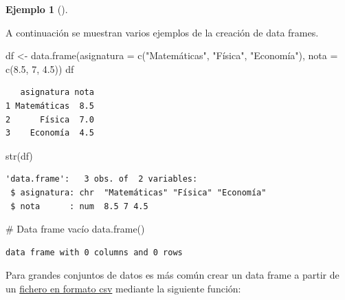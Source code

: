 \documentclass[
  a4paper,
]{scrreport}
\newenvironment{Shaded}{\begin{snugshade}}{\end{snugshade}}
\newcommand{\AttributeTok}[1]{\textcolor[rgb]{0.40,0.45,0.13}{#1}}
\newcommand{\CommentTok}[1]{\textcolor[rgb]{0.37,0.37,0.37}{#1}}
\newcommand{\DecValTok}[1]{\textcolor[rgb]{0.68,0.00,0.00}{#1}}
\newcommand{\FloatTok}[1]{\textcolor[rgb]{0.68,0.00,0.00}{#1}}
\newcommand{\FunctionTok}[1]{\textcolor[rgb]{0.28,0.35,0.67}{#1}}
\newcommand{\NormalTok}[1]{\textcolor[rgb]{0.00,0.23,0.31}{#1}}
\newcommand{\OtherTok}[1]{\textcolor[rgb]{0.00,0.23,0.31}{#1}}
\newcommand{\StringTok}[1]{\textcolor[rgb]{0.13,0.47,0.30}{#1}}
\theoremstyle{definition}
\theoremstyle{definition}
\newtheorem{example}{Ejemplo}[chapter]
\theoremstyle{remark}
\begin{document}
\leavevmode{}%
\begin{example}[]\label{exm-creacion-data-frames}

A continuación se muestran varios ejemplos de la creación de data
frames.

\begin{Shaded}
\begin{Highlighting}[]
\NormalTok{df }\OtherTok{\textless{}{-}} \FunctionTok{data.frame}\NormalTok{(}\AttributeTok{asignatura =} \FunctionTok{c}\NormalTok{(}\StringTok{"Matemáticas"}\NormalTok{, }\StringTok{"Física"}\NormalTok{, }\StringTok{"Economía"}\NormalTok{), }\AttributeTok{nota =} \FunctionTok{c}\NormalTok{(}\FloatTok{8.5}\NormalTok{, }\DecValTok{7}\NormalTok{, }\FloatTok{4.5}\NormalTok{))}
\NormalTok{df}
\end{Highlighting}
\end{Shaded}

\begin{verbatim}
   asignatura nota
1 Matemáticas  8.5
2      Física  7.0
3    Economía  4.5
\end{verbatim}

\begin{Shaded}
\begin{Highlighting}[]
\FunctionTok{str}\NormalTok{(df)}
\end{Highlighting}
\end{Shaded}

\begin{verbatim}
'data.frame':   3 obs. of  2 variables:
 $ asignatura: chr  "Matemáticas" "Física" "Economía"
 $ nota      : num  8.5 7 4.5
\end{verbatim}

\begin{Shaded}
\begin{Highlighting}[]
\CommentTok{\# Data frame vacío}
\FunctionTok{data.frame}\NormalTok{()}
\end{Highlighting}
\end{Shaded}

\begin{verbatim}
data frame with 0 columns and 0 rows
\end{verbatim}

\end{example}

Para grandes conjuntos de datos es más común crear un data frame a
partir de un
\href{https://es.wikipedia.org/wiki/Valores_separados_por_comas}{fichero
en formato csv} mediante la siguiente función:
\end{document}
